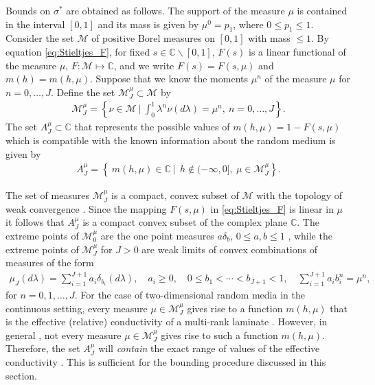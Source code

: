 \documentclass{cmslatex}
\begin{document}
Bounds on $\sigma^*$ are obtained as follows. The support of the measure
$\mu$ is contained in the interval $[0,1]$ and its mass is given by
$\mu^0=p_1$, where $0\leq p_1\leq1$. Consider the set $\mathscr{M}$ of
positive Borel measures on $[0,1]$ with mass $\leq1$. By equation
\eqref{eq:Stieltjes_F}, for fixed $s\in\mathbb{C}\backslash[0,1]$, $F(s)$ is a
linear functional of the measure $\mu$, $F:\mathscr{M}\mapsto\mathbb{C}$, and
we write $F(s)=F(s,\mu)$ and $m(h)=m(h,\mu)$. Suppose that we know the
moments $\mu^n$ of the measure $\mu$ for $n=0,\ldots,J$. Define the set
$\mathscr{M}_J^\mu\subset\mathscr{M}$
by 
% 
\begin{align}\label{eq:Measure_Set}
  \mathscr{M}_J^\mu
     =\left\{\nu\in\mathscr{M} \ \Big| \   \int_0^1\lambda^n\nu(d\lambda)=\mu^n, \  n=0,\ldots,J\right\}  . 
\end{align}
%
The set $A_J^\mu\subset\mathbb{C}$ that represents the possible
values of $m(h,\mu)=1-F(s,\mu)$ which is compatible with the
known information about the random medium is given by
%
\begin{align}\label{eq:Bounding_Set}
  A_J^\mu
     =\left\{\ m(h,\mu)\in\mathbb{C} \ | \
       \ h\not\in(-\infty,0], \ \mu\in \mathscr{M}_J^\mu\right\}. 
\end{align}
%



The set of measures $\mathscr{M}_J^\mu$ is a compact, convex
subset of $\mathscr{M}$ with the topology of weak convergence
\cite{Golden:CMP-473}. Since the mapping $F(s,\mu)$ in
\eqref{eq:Stieltjes_F} is linear in $\mu$ it follows that
$A_J^\mu$ is a compact convex subset of the complex plane
$\mathbb{C}$. The extreme points of $\mathscr{M}_0^\mu$ are the one 
point measures $a\delta_b$, $0\leq a,b\leq1$ \cite{Dunford_Schwartz:LinOp_PtI},
while the extreme points of $\mathscr{M}_J^\mu$ for $J>0$ are weak limits
of convex combinations of measures of the form
\cite{Karlin_Studden:Book:1966,Golden:CMP-473}  
%
\begin{align}\label{eq:Discrete_Measure}
  \mu_J(d\lambda)=\sum_{i=1}^{J+1}a_i\delta_{b_i}(d\lambda), \quad
  a_i\geq0, \quad 0\leq b_1<\cdots<b_{J+1}<1, \quad
  \sum_{i=1}^{J+1}a_ib_i^n=\mu^n,
\end{align}
%
for $n=0,1,\ldots,J$. For the case of two-dimensional random media in the
continuous setting, every measure $\mu\in\mathscr{M}_J^\mu$ gives rise
to a function $m(h,\mu)$ that is the effective (relative) conductivity
of a multi-rank laminate \cite{MILTON:2002:TC}.
However, in general \cite{Golden:CMP-473},  not every measure
$\mu\in\mathscr{M}_J^\mu$ gives rise to such a function $m(h,\mu)$. Therefore,
the set $A_J^\mu$ will \emph{contain} the exact range of values of the
effective conductivity \cite{Golden:CMP-473}. This is sufficient for
the bounding procedure discussed in this section. 
\end{document}
